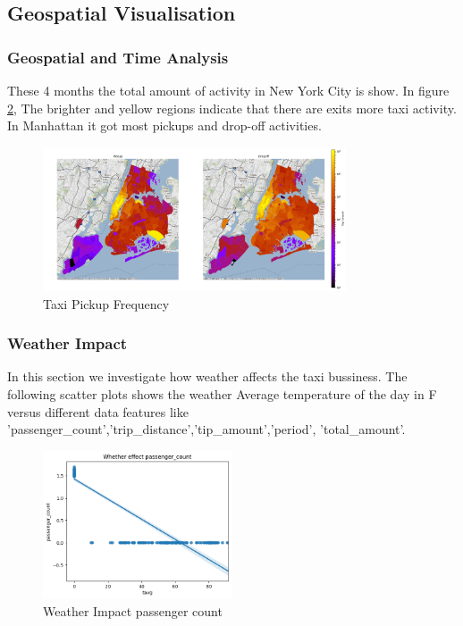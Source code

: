 \documentclass[11pt]{article}
\begin{document}
\subsection{Geospatial Visualisation}
\subsubsection{Geospatial and Time Analysis}

These 4 months the total amount of activity in New York City is show. In ﬁgure \ref{fig:image3}, The brighter and yellow regions indicate that there are exits more taxi activity. In Manhattan it got most pickups and drop-off activities.

\begin{figure}[!h]
    \centering
    \includegraphics[width=0.8\textwidth]{plots/p3.png}
    \caption{Taxi Pickup Frequency} %
    \label{fig:image2}
\end{figure}

\subsubsection{Weather Impact}
In this section we investigate how weather affects the taxi bussiness. The following scatter plots shows the weather Average temperature of the day in F versus diﬀerent data features like 'passenger\_count','trip\_distance','tip\_amount','period', 'total\_amount'. 

\begin{figure}[!h]
    \centering
    \includegraphics[width=0.5\textwidth]{plots/p4.png}
    \caption{Weather Impact passenger count} %
    \label{fig:image3}
\end{figure}
\end{document}
